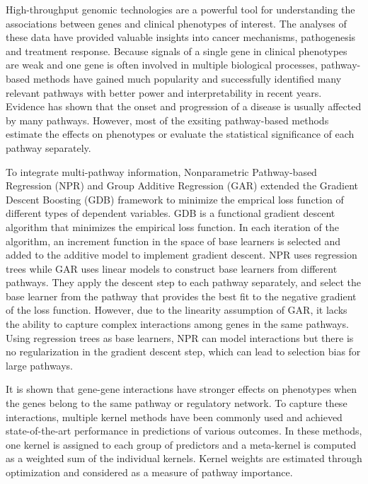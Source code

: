 \documentclass[a4paper,12pt]{article}
\begin{document}
High-throughput genomic technologies are a powerful tool for understanding the associations between genes and clinical phenotypes of interest. The analyses of these data have provided valuable insights into cancer mechanisms, pathogenesis and treatment response. Because signals of a single gene in clinical phenotypes are weak and one gene is often involved in multiple biological processes, pathway-based methods have gained much popularity and successfully identified many relevant pathways with better power and interpretability in recent years.\cite{subramanian2005gene, ramanan2012pathway} Evidence has shown that the onset and progression of a disease is usually affected by many pathways.\cite{shou2004mechanisms, shtivelman2014molecular, berk2009neuroprogression} However, most of the exsiting pathway-based methods estimate the effects on phenotypes or evaluate the statistical significance of each pathway separately.\cite{subramanian2005gene,liu2007semiparametric,wu2011rare}

To integrate multi-pathway information, Nonparametric Pathway-based Regression (NPR)\cite{wei2007nonparametric} and Group Additive Regression (GAR)\cite{luan2007group} extended the Gradient Descent Boosting (GDB)\cite{friedman2001greedy} framework to minimize the emprical loss function of different types of dependent variables. GDB is a functional gradient descent algorithm that minimizes the empirical loss function. In each iteration of the algorithm, an increment function in the space of base learners is selected and added to the additive model to implement gradient descent. NPR uses regression trees while GAR uses linear models to construct base learners from different pathways. They apply the descent step to each pathway separately, and select the base learner from the pathway that provides the best fit to the negative gradient of the loss function. However, due to the linearity assumption of GAR, it lacks the ability to capture complex interactions among genes in the same pathways. Using regression trees as base learners, NPR can model interactions but there is no regularization in the gradient descent step, which can lead to selection bias for large pathways.

It is shown that gene-gene interactions have stronger effects on phenotypes when the genes belong to the same pathway or regulatory network.\cite{carlson2004mapping} To capture these interactions, multiple kernel methods have been commonly used and achieved state-of-the-art performance in predictions of various outcomes.\cite{gonen2014drug,costello2014community, aiolli2015easymkl,friedrichs2017pathway, manica2019pimkl} In these methods, one kernel is assigned to each group of predictors and a meta-kernel is computed as a weighted sum of the individual kernels. Kernel weights are estimated through optimization and considered as a measure of pathway importance. 
\end{document}

